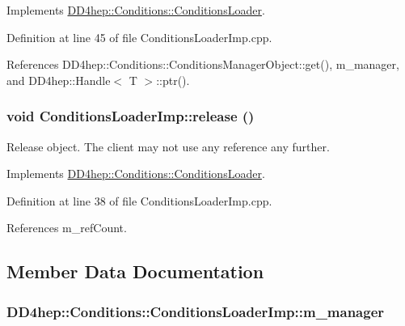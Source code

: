 Implements \hyperlink{class_d_d4hep_1_1_conditions_1_1_conditions_loader_a9705bbf09205a5f20a979ae3fe1005bb}{DD4hep::Conditions::ConditionsLoader}.

Definition at line 45 of file ConditionsLoaderImp.cpp.

References DD4hep::Conditions::ConditionsManagerObject::get(), m\_\-manager, and DD4hep::Handle$<$ T $>$::ptr().\hypertarget{class_d_d4hep_1_1_conditions_1_1_conditions_loader_imp_a757ca1fe35b22abe5d4efde0fdc36396}{
\subsubsection[{release}]{\setlength{\rightskip}{0pt plus 5cm}void ConditionsLoaderImp::release ()}}
\label{class_d_d4hep_1_1_conditions_1_1_conditions_loader_imp_a757ca1fe35b22abe5d4efde0fdc36396}


Release object. The client may not use any reference any further. 

Implements \hyperlink{class_d_d4hep_1_1_conditions_1_1_conditions_loader_a0d1ad39d3ed19e648c673497c6995079}{DD4hep::Conditions::ConditionsLoader}.

Definition at line 38 of file ConditionsLoaderImp.cpp.

References m\_\-refCount.

\subsection{Member Data Documentation}
\hypertarget{class_d_d4hep_1_1_conditions_1_1_conditions_loader_imp_ab6ca31cc5ee9e155af821c6c755d60c6}{
\subsubsection[{m\_\-manager}]{ {\bf DD4hep::Conditions::ConditionsLoaderImp::m\_\-manager}}}
\label{class_d_d4hep_1_1_conditions_1_1_conditions_loader_imp_ab6ca31cc5ee9e155af821c6c755d60c6}


